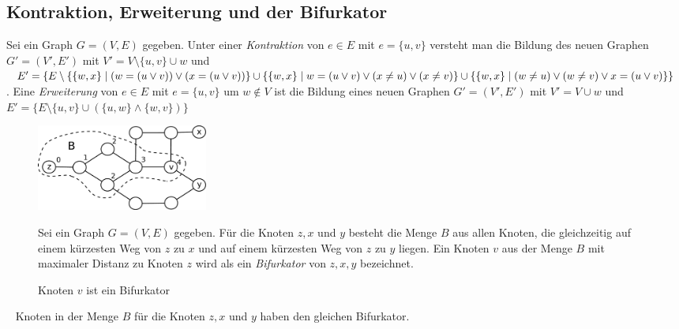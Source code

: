 \subsection{Kontraktion, Erweiterung und der Bifurkator}
Sei ein Graph $G=(V,E)$ gegeben. Unter einer \emph{Kontraktion} von $e \in E$ mit $e=\{u,v\}$ versteht man die Bildung des neuen Graphen $G'=(V',E')$ mit $V'=V \setminus{\{u,v\}} \cup w$ und $E'=\{E\setminus\{\{w,x\}\;|\;(w=(u \vee v)) \vee (x=(u\vee v))\} \cup\\ \{\{w,x\}\;|\;w=(u \vee v) \vee (x\neq u)\vee(x \neq v)\} \cup \{\{w,x\}\;|\;(w\neq u) \vee (w \neq v) \vee x=(u\vee v)\} \}$.\newline\newline
Eine \emph{Erweiterung} von $e \in E$ mit $e=\{u,v\}$ um $w \notin V$ ist die Bildung eines neuen Graphen $G'=(V',E')$ mit $V'=V \cup w$ und $E'=\{E \setminus \{u,v\} \cup (\{u,w\} \wedge \{w,v\})\}$\newline
\vspace{-4mm}
\begin{figure}[ht]
\begin{minipage}{210pt}
\centering
\includegraphics*[width = 160pt]{bilder/bifurkator.pdf}
\caption{Knoten $v$ ist ein Bifurkator}
\label{bild:bifurkator}
\end{minipage}
\begin{minipage}{210pt}
Sei ein Graph $G=(V,E)$ gegeben. Für die Knoten $z,x$ und $y$ besteht die Menge $B$ aus allen Knoten, die gleichzeitig auf einem kürzesten Weg von $z$ zu $x$ und auf einem kürzesten Weg von $z$ zu $y$ liegen. Ein Knoten $v$ aus der Menge $B$ mit maximaler Distanz zu Knoten $z$ wird als ein \emph{Bifurkator} von $z, x, y$ bezeichnet.
\end{minipage}
\end{figure}
\vspace{-2mm}  	
~\linebreak
Knoten in der Menge $B$ für die Knoten $z,x$ und $y$ haben den gleichen Bifurkator.
\vspace{-7mm}
